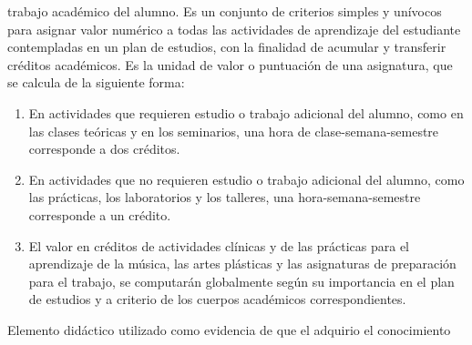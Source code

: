 \begin{bGlosario}
	trabajo académico del alumno.
 	  Es  un  conjunto  de  criterios  simples  y  unívocos  para
 	asignar  valor  numérico  a  todas  las actividades  de  aprendizaje  del  estudiante  contempladas  en  un  plan  de  estudios, con la finalidad
	de acumular y transferir créditos académicos.
 	 Es la unidad de valor o puntuación de una asignatura, que se calcula de la siguiente forma:
 	\begin{enumerate}
 		\item  En actividades que requieren estudio o trabajo adicional del alumno, como en las clases teóricas y en los seminarios, una hora de
		clase-semana-semestre corresponde a dos créditos.
 		\item En actividades que no requieren estudio o trabajo adicional del alumno, como las prácticas, los laboratorios y los talleres,
		una hora-semana-semestre corresponde a un crédito.
 		\item  El valor en créditos de actividades clínicas y de las prácticas para el aprendizaje de la música, las artes plásticas y las
		asignaturas de preparación para el trabajo, se computarán globalmente según su importancia en el plan de estudios y a criterio de los cuerpos
		académicos correspondientes.
 	\end{enumerate}
	 Elemento didáctico utilizado como evidencia de que el  adquirio el conocimiento

\end{bGlosario}
